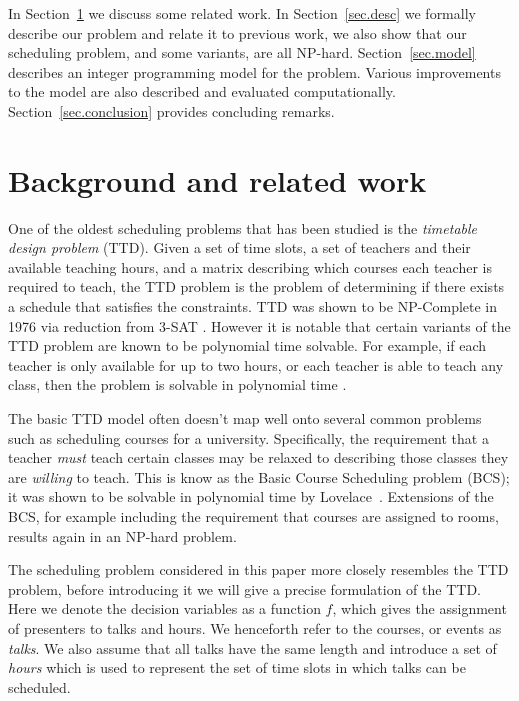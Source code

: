 \documentclass{svjour3}                     %
\begin{document}
In Section~\ref{sec.back} we discuss some related work.
In Section~\ref{sec.desc} we formally describe our problem and relate it to previous work,
we also show that our scheduling problem, and some variants, are all NP-hard.
Section~\ref{sec.model} describes an integer programming model for the problem.
Various improvements to the model are also described and evaluated computationally.
Section~\ref{sec.conclusion} provides concluding remarks.

\section{Background and related work}\label{sec.back}

One of the oldest scheduling problems that has been studied is the \emph{timetable design problem} (TTD). 
Given a set of time slots, a set of teachers and their available teaching hours, and a matrix describing which courses each teacher is required to teach,  the TTD problem is the problem of determining if there exists a schedule that satisfies the constraints. 
TTD was shown to be NP-Complete in 1976 via reduction from 3-SAT \cite{even76}. 
However it is notable that certain variants of the TTD problem are known to be polynomial time solvable. 
For example, if each teacher is only available for up to two hours, or each teacher is able to teach any class, then the problem is solvable in polynomial time \cite{garey76}.

The basic TTD model often doesn't map well onto several common problems such as scheduling courses for a university. 
Specifically, the requirement that a teacher \emph{must} teach certain classes may be relaxed to describing those classes they are \emph{willing} to teach. 
This is know as the Basic Course Scheduling problem (BCS); it was shown to be solvable in polynomial time by Lovelace~\cite{lovelace2010}. 
Extensions of the BCS, for example including the requirement that courses are assigned to rooms, results again in an NP-hard problem.

The scheduling problem considered in this paper more closely resembles the TTD problem, before introducing it we will give a precise formulation of the TTD.
Here we denote the decision variables as a function $f$, which gives the assignment of presenters to talks and hours.
We henceforth refer to the courses, or events as \emph{talks}.
We also assume that all talks have the same length and introduce a set of \emph{hours} which is used to represent the set of time slots in which talks can be scheduled.
\end{document}
